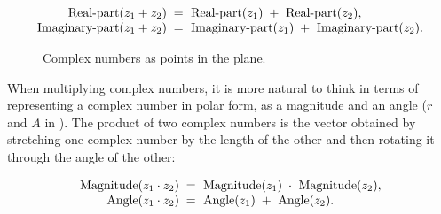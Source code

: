 $$
\begin{array}{r@{{}={}}l}
  \hbox{Real-part} (z_1 + z_2)\; 	&
	\hbox{ Real-part} (z_1)\; + \hbox{ Real-part} (z_2), \\
  \hbox{Imaginary-part} (z_1 + z_2)\; 	&
	\hbox{ Imaginary-part} (z_1)\; + \hbox{ Imaginary-part} (z_2).
\end{array}
$$


\begin{figure}[tb]
\label{Figure 2.20}
\centering
\begin{comment}
\heading{Figure 2.20:} Complex numbers as points in the plane.

\begin{example}
 Imaginary
    ^
    |
  y |.........................* z = x + ?y = r e^(?A)
    |                    __-- .
    |                __--     .
    |          r __--         .
    |        __--             .
    |    __-- \               .
    |__--    A |              .
----+----------+-------------------> Real
                              x
\end{example}
\end{comment}

\par\bigskip
\noindent
{} Complex numbers as points in the plane.
\end{figure}

When multiplying complex numbers, it is more natural to think in terms of
representing a complex number in polar form, as a magnitude and an angle (\( r \)
and \( A \) in ).  The product of two complex numbers is the
vector obtained by stretching one complex number by the length of the other and
then rotating it through the angle of the other:
\begin{comment}

\begin{example}
Magnitude(z_1 * z_2) = Magnitude(z_1) * Magnitude(z_2)

Angle(z_1 * z_2) = Angle(z_1) + Angle(z_2)
\end{example}

\end{comment}

$$
\begin{array}{r@{{}={}}l}
	\hbox{Magnitude} (z_1 \cdot z_2)\; 	&
		\hbox{ Magnitude} (z_1)\; \cdot \hbox{ Magnitude} (z_2), \\
	\hbox{Angle} (z_1 \cdot z_2)\; 		&
		\hbox{ Angle} (z_1)\; + \hbox{ Angle} (z_2).
\end{array}
$$


